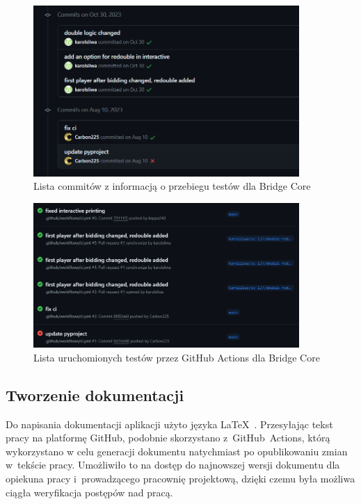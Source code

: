 \begin{figure}[hbt!]
    \centering
    \includegraphics[width=0.9\textwidth]{img/github/github-commits.png}
    \caption{Lista commitów z informacją o przebiegu testów dla Bridge Core}
    \label{fig:github-commits}
\end{figure}

\begin{figure}[hbt!]
    \centering
    \includegraphics[width=0.9\textwidth]{img/github/github-tests.png}
    \caption{Lista uruchomionych testów przez GitHub Actions dla Bridge Core}
    \label{fig:github-tests}
\end{figure}


\subsection{Tworzenie dokumentacji}

Do napisania dokumentacji aplikacji użyto języka \LaTeX~\cite{Latex}.
Przesyłając tekst pracy na platformę GitHub, podobnie skorzystano
\mbox{z GitHub Actions}, którą wykorzystano w celu
generacji dokumentu natychmiast po opublikowaniu zmian w~tekście pracy.
Umożliwiło to na dostęp do najnowszej wersji dokumentu dla opiekuna
pracy i~prowadzącego pracownię projektową, dzięki czemu była możliwa
ciągła weryfikacja postępów nad pracą.

